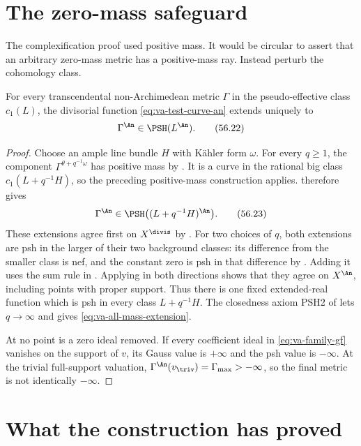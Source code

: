 \section{The zero-mass safeguard}
\label{sec:va-zero-mass}

The complexification proof used positive mass.
It would be circular to assert that an arbitrary zero-mass metric has a
positive-mass ray.
Instead perturb the cohomology class.

\begin{theorem}\label{thm:va-all-masses}
For every transcendental non-Archimedean metric
$\Gamma$ in the pseudo-effective class $c_1(L)$, the divisorial function
\eqref{eq:va-test-curve-an} extends uniquely to
\[
                           \Gamma^{\An}\in\PSH(L^{\An}).
\tag{56.22}\label{eq:va-all-mass-extension}
\]
\end{theorem}

\begin{proof}
Choose an ample line bundle $H$ with K\"ahler form $\omega$.
For every $q\geq1$, the component
$\Gamma^{\theta+q^{-1}\omega}$ has positive mass by
. It is a curve in the rational big class
$c_1(L+q^{-1}H)$, so the preceding positive-mass construction applies.
 therefore gives
\[
 \Gamma^{\An}\in
       \PSH\bigl((L+q^{-1}H)^{\An}\bigr).
\tag{56.23}\label{eq:va-perturbed-classes}
\]
These extensions agree first on $X^{\divis}$ by
. For two choices of $q$, both
extensions are psh in the larger of their two background classes:
its difference from the smaller class is nef, and the constant zero
is psh in that difference by .
Adding it uses the sum rule in .
Applying \cite[Theorem~4.22]{BJ22} in both directions shows that
they agree on $X^{\An}$, including points with proper support.
Thus there is one fixed extended-real function which is psh in every class
$L+q^{-1}H$.  The closedness axiom PSH2 of \cite{BJ22} lets
$q\to\infty$ and gives
\eqref{eq:va-all-mass-extension}.

At no point is a zero ideal removed.
If every coefficient ideal in
\eqref{eq:va-family-gf} vanishes on the support of $v$, its Gauss value is
$+\infty$ and the psh value is $-\infty$.
At the trivial full-support valuation,
$\Gamma^{\An}(v_{\triv})=\Gamma_{\max}>-\infty$, so the final metric is not
identically $-\infty$.
\end{proof}

\section{What the construction has proved}
\label{sec:va-conclusion}

